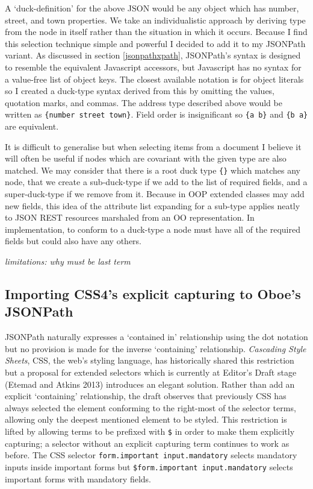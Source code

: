 \documentclass[]{article}
\begin{document}
A `duck-definition' for the above JSON would be any object which has
number, street, and town properties. We take an individualistic approach
by deriving type from the node in itself rather than the situation in
which it occurs. Because I find this selection technique simple and
powerful I decided to add it to my JSONPath variant. As discussed in
section \ref{jsonpathxpath}, JSONPath's syntax is designed to resemble
the equivalent Javascript accessors, but Javascript has no syntax for a
value-free list of object keys. The closest available notation is for
object literals so I created a duck-type syntax derived from this by
omitting the values, quotation marks, and commas. The address type
described above would be written as \texttt{\{number street town\}}.
Field order is insignificant so \texttt{\{a b\}} and \texttt{\{b a\}}
are equivalent.

It is difficult to generalise but when selecting items from a document I
believe it will often be useful if nodes which are covariant with the
given type are also matched. We may consider that there is a root duck
type \texttt{\{\}} which matches any node, that we create a
sub-duck-type if we add to the list of required fields, and a
super-duck-type if we remove from it. Because in OOP extended classes
may add new fields, this idea of the attribute list expanding for a
sub-type applies neatly to JSON REST resources marshaled from an OO
representation. In implementation, to conform to a duck-type a node must
have all of the required fields but could also have any others.

\emph{limitations: why must be last term}

\subsection{Importing CSS4's explicit capturing to Oboe's JSONPath}

JSONPath naturally expresses a `contained in' relationship using the dot
notation but no provision is made for the inverse `containing'
relationship. \emph{Cascading Style Sheets}, CSS, the web's styling
language, has historically shared this restriction but a proposal for
extended selectors which is currently at Editor's Draft stage (Etemad
and Atkins 2013) introduces an elegant solution. Rather than add an
explicit `containing' relationship, the draft observes that previously
CSS has always selected the element conforming to the right-most of the
selector terms, allowing only the deepest mentioned element to be
styled. This restriction is lifted by allowing terms to be prefixed with
\texttt{\$} in order to make them explicitly capturing; a selector
without an explicit capturing term continues to work as before. The CSS
selector \texttt{form.important input.mandatory} selects mandatory
inputs inside important forms but
\texttt{\$form.important input.mandatory} selects important forms with
mandatory fields.
\end{document}
